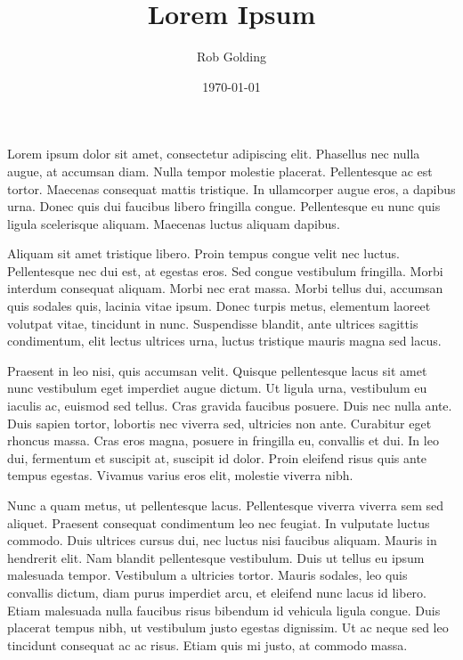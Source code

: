 \documentclass[a4paper,11pt]{article}
\title{Lorem Ipsum}
\author{Rob Golding} \date{\today}
\begin{document}
    \maketitle

    Lorem ipsum dolor sit amet, consectetur adipiscing elit. Phasellus nec
    nulla augue, at accumsan diam. Nulla tempor molestie placerat. Pellentesque
    ac est tortor. Maecenas consequat mattis tristique. In ullamcorper augue
    eros, a dapibus urna. Donec quis dui faucibus libero fringilla congue.
    Pellentesque eu nunc quis ligula scelerisque aliquam. Maecenas luctus
    aliquam dapibus.

    Aliquam sit amet tristique libero. Proin tempus congue velit nec luctus.
    Pellentesque nec dui est, at egestas eros. Sed congue vestibulum fringilla.
    Morbi interdum consequat aliquam. Morbi nec erat massa. Morbi tellus dui,
    accumsan quis sodales quis, lacinia vitae ipsum. Donec turpis metus,
    elementum laoreet volutpat vitae, tincidunt in nunc. Suspendisse blandit,
    ante ultrices sagittis condimentum, elit lectus ultrices urna, luctus
    tristique mauris magna sed lacus.

    Praesent in leo nisi, quis accumsan velit. Quisque pellentesque lacus sit
    amet nunc vestibulum eget imperdiet augue dictum. Ut ligula urna,
    vestibulum eu iaculis ac, euismod sed tellus. Cras gravida faucibus
    posuere. Duis nec nulla ante. Duis sapien tortor, lobortis nec viverra sed,
    ultricies non ante.  Curabitur eget rhoncus massa. Cras eros magna, posuere
    in fringilla eu, convallis et dui. In leo dui, fermentum et suscipit at,
    suscipit id dolor.  Proin eleifend risus quis ante tempus egestas. Vivamus
    varius eros elit, molestie viverra nibh.

    Nunc a quam metus, ut pellentesque lacus. Pellentesque viverra viverra sem
    sed aliquet. Praesent consequat condimentum leo nec feugiat. In vulputate
    luctus commodo. Duis ultrices cursus dui, nec luctus nisi faucibus aliquam.
    Mauris in hendrerit elit. Nam blandit pellentesque vestibulum. Duis ut
    tellus eu ipsum malesuada tempor. Vestibulum a ultricies tortor. Mauris
    sodales, leo quis convallis dictum, diam purus imperdiet arcu, et eleifend
    nunc lacus id libero.  Etiam malesuada nulla faucibus risus bibendum id
    vehicula ligula congue. Duis placerat tempus nibh, ut vestibulum justo
    egestas dignissim. Ut ac neque sed leo tincidunt consequat ac ac risus.
    Etiam quis mi justo, at commodo massa.
\end{document}
